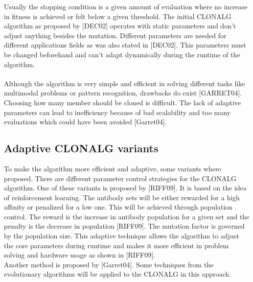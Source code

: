Usually the stopping condition is a given amount of evaluation where no increase in fitness is achieved or felt below a given threshold. The initial CLONALG algorithm as proposed by [DEC02] operates with static parameters and don't adjust anything besides the mutation. Different parameters are needed for different applications fields as was also stated in [DEC02]. This parameters must be changed beforehand and can't adapt dynamically during the runtime of the algorithm.\\\\
Although the algorithm is very simple and efficient in solving different tasks like multimodal problems or pattern recognition, drawbacks do exist [GARRET04]. Choosing how many member should be cloned is difficult. The lack of adaptive parameters can lead to inefficiency because of bad scalability and too many evaluations which could have been avoided [Garret04].
\subsection{Adaptive CLONALG variants}
To make the algorithm more efficient and adaptive, some variants where proposed. There are different parameter control strategies for the CLONALG algorithm. One of these variants is proposed by [RIFF09]. It is based on the idea of reinforcement learning. The antibody sets will be either rewarded for a high affinity or penalized for a low one. This will be achieved through population control. The reward is the increase in antibody population for a given set and the penalty is the decrease in population [RIFF09]. The mutation factor is governed by the population size. This adaptive technique allows the algorithm to adjust the core parameters during runtime and makes it more efficient in problem solving and hardware usage as shown in [RIFF09].\\
Another method is proposed by [Garret04]. Some techniques from the evolutionary algorithms will be applied to the CLONALG in this approach.
 




